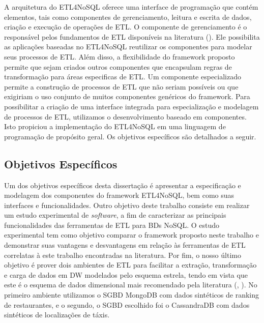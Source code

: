 A arquitetura do ETL4NoSQL oferece uma interface de programação que contém elementos, tais como componentes de gerenciamento, leitura e escrita de dados, criação e execução de operações de ETL. O componente de gerenciamento é o responsável pelos fundamentos de ETL disponíveis na literatura (\cite{kimball:2004}). Ele possibilita as aplicações baseadas no ETL4NoSQL reutilizar os componentes para modelar seus processos de ETL. Além disso, a flexibilidade do framework proposto permite que sejam criados outros componentes que encapsulam regras de transformação para áreas especificas de ETL. Um componente especializado permite a construção de processos de ETL que não seriam possíveis ou que exigiriam o uso conjunto de muitos componentes genéricos do framework. Para possibilitar a criação de uma interface integrada para especialização e modelagem de processos de ETL, utilizamos o desenvolvimento baseado em componentes. Isto propiciou a implementação do ETL4NoSQL em uma linguagem de programação de propósito geral. Os objetivos específicos são detalhados a seguir.

\subsection{Objetivos Específicos}

Um dos objetivos específicos desta dissertação é apresentar a especificação e modelagem dos componentes do framework ETL4NoSQL, bem como suas interfaces e funcionalidades. Outro objetivo deste trabalho consiste em realizar um estudo experimental de \textit{software}, a fim de caracterizar as principais funcionalidades das ferramentas de ETL para BDs NoSQL. O estudo experimental tem como objetivo comparar o framework proposto neste trabalho e demonstrar suas vantagens e desvantagens em relação às ferramentas de ETL correlatas à este trabalho encontradas na literatura. Por fim, o nosso último objetivo é prover dois ambientes de ETL para facilitar a extração, transformação e carga de dados em DW modelados pelo esquema estrela, tendo em vista que este é o esquema de dados dimensional mais recomendado pela literatura (\cite{inmon:2002}, \cite{kimball:2002}). No primeiro ambiente utilizamos o SGBD MongoDB com dados sintéticos de ranking de restaurantes, e o segundo, o SGBD escolhido foi o CassandraDB com dados sintéticos de localizações de táxis.




